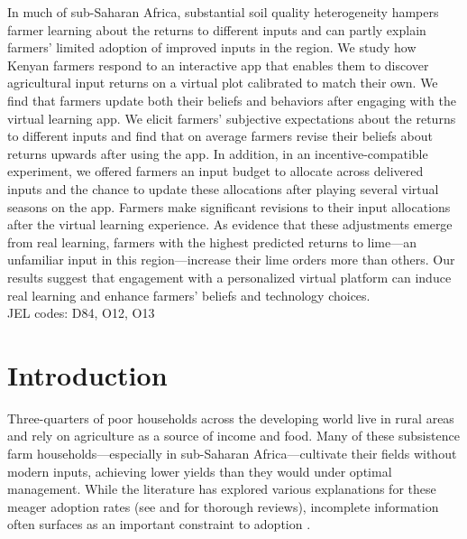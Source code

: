 \documentclass[12pt,letterpaper]{article}
\begin{document}
\vspace{.2in} 
\noindent In much of sub-Saharan Africa, substantial soil quality heterogeneity hampers farmer learning about the returns to different inputs and can partly explain farmers' limited adoption of improved inputs in the region. We study how Kenyan farmers respond to an interactive app that enables them to discover agricultural input returns on a virtual plot calibrated to match their own. We find that farmers update both their beliefs and behaviors after engaging with the virtual learning app. We elicit farmers' subjective expectations about the returns to different inputs and find that on average farmers revise their beliefs about returns upwards after using the app. In addition, in an incentive-compatible experiment, we offered farmers an input budget to allocate across delivered inputs and the chance to update these allocations after playing several virtual seasons on the app. Farmers make significant revisions to their input allocations after the virtual learning experience. As evidence that these adjustments emerge from real learning, farmers with the highest predicted returns to lime---an unfamiliar input in this region---increase their lime orders more than others. Our results suggest that engagement with a personalized virtual platform can induce real learning and enhance  farmers' beliefs and technology choices. \\ JEL codes: D84, O12, O13

\doublespace

\newpage

\section{Introduction}

Three-quarters of poor households across the developing world live in rural areas and rely on agriculture as a source of income and food. Many of these subsistence farm households---especially in sub-Saharan Africa---cultivate their fields without modern inputs, achieving lower yields than they would under optimal management. While the literature has explored various explanations for these meager adoption rates (see \citealt{jack2011constraints} and \citealt{magruder2018assessment} for thorough reviews),
incomplete information often surfaces as an important constraint to adoption \citep{magruder2018assessment}. 
\end{document}
